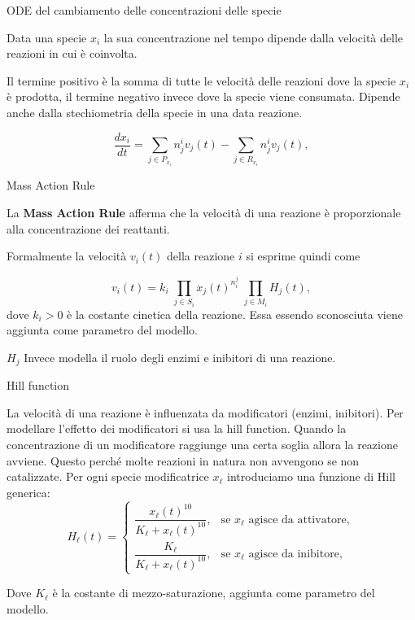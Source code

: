 \documentclass{beamer}
\begin{document}
\begin{frame}[fragile]{ODE del cambiamento delle concentrazioni delle specie}


Data una specie $x_i$ la sua concentrazione nel tempo dipende dalla velocità delle reazioni in cui è
coinvolta.

Il termine positivo è la somma di tutte le velocità delle reazioni dove la specie $x_i$ è prodotta, il termine negativo
invece dove la specie viene consumata. Dipende anche dalla stechiometria della specie in una data reazione.

\[
\frac{dx_i}{dt}=\sum_{j\in P_{x_i}} n^i_j v_j(t) - \sum_{j\in R_{x_i}} n_j^i v_j(t),
\]
\end{frame}

\begin{frame}[fragile]{Mass Action Rule}

La \textbf{Mass Action Rule} afferma che la velocità di una reazione è proporzionale alla concentrazione
dei reattanti.

Formalmente la velocità \(v_i(t)\) della reazione $i$ si esprime quindi come

\[
v_i(t)=k_i\;\prod_{j\in S_i} x_j(t)^{n_i^j}\;\prod_{j\in M_i} H_j(t),
\]
dove \(k_i>0\) è la costante cinetica della reazione. Essa essendo sconosciuta viene aggiunta
come parametro del modello.

$H_j$ Invece modella il ruolo degli enzimi e inibitori di una reazione.

\end{frame}

\begin{frame}[fragile]{Hill function}

La velocità di una reazione è influenzata da modificatori (enzimi, inibitori). Per modellare l'effetto dei modificatori si usa la hill function. Quando la concentrazione di un modificatore raggiunge una certa soglia allora la reazione avviene.
Questo perché molte reazioni in natura non avvengono se non catalizzate.
Per ogni specie modificatrice \(x_\ell\) introduciamo una funzione di Hill generica:
\[
H_\ell(t) =
\begin{cases}
\dfrac{x_\ell(t)^{10}}{K_\ell + x_\ell(t)^{10}}, &\text{se \(x_\ell\) agisce da attivatore},\\[8pt]
\dfrac{K_\ell}{K_\ell + x_\ell(t)^{10}}, &\text{se \(x_\ell\) agisce da inibitore},
\end{cases}
\]

Dove $K_\ell$ è la costante di mezzo-saturazione, aggiunta come parametro del modello.

\end{frame}
\end{document}
